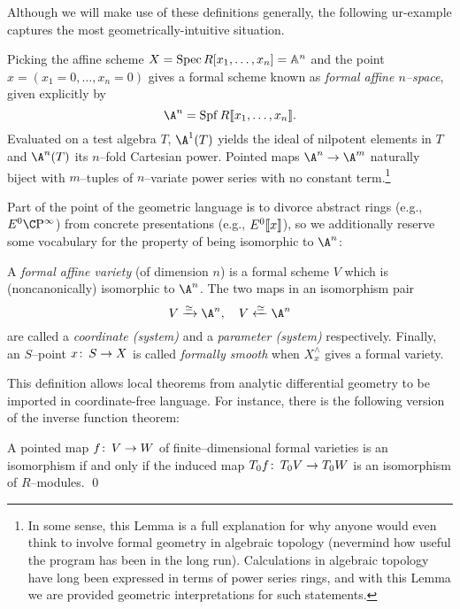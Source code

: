 Although we will make use of these definitions generally, the following ur-example captures the most geometrically-intuitive situation.

\begin{example}\label{MapsOfFVarsArePowerSeries}
Picking the affine scheme $X = \operatorname{Spec} R[x_1, \ldots, x_n] = \mathbb A^n$ and the point $x = (x_1 = 0, \ldots, x_n = 0)$ gives a formal scheme known as \textit{formal affine $n$--space}, given explicitly by \[\A^n = \Spf R\llbracket x_1, \ldots, x_n\rrbracket.\]  Evaluated on a test algebra $T$, $\A^1(T)$ yields the ideal of nilpotent elements in $T$ and $\A^n(T)$ its $n$--fold Cartesian power.  Pointed maps $\A^n \to \A^m$ naturally biject with $m$--tuples of $n$--variate power series with no constant term.\footnote{In some sense, this Lemma is a full explanation for why anyone would even think to involve formal geometry in algebraic topology (nevermind how useful the program has been in the long run).  Calculations in algebraic topology have long been expressed in terms of power series rings, and with this Lemma we are provided geometric interpretations for such statements.}
\end{example}

Part of the point of the geometric language is to divorce abstract rings (e.g., $E^0 \CP^\infty$) from concrete presentations (e.g., $E^0\llbracket{x}\rrbracket$), so we additionally reserve some vocabulary for the property of being isomorphic to $\A^n$:
\begin{definition}\label{DefnFormalVariety}
A \textit{formal affine variety} (of dimension $n$) is a formal scheme $V$ which is (noncanonically) isomorphic to $\A^n$.  The two maps in an isomorphism pair \[V \xrightarrow{\simeq} \A^n, \quad V \xleftarrow{\simeq} \A^n\] are called a \textit{coordinate (system)} and a \textit{parameter (system)} respectively.  Finally, an $S$--point $x\colon\thinspace S \to X$ is called \textit{formally smooth} when $X^\wedge_x$ gives a formal variety.
\end{definition}

This definition allows local theorems from analytic differential geometry to be imported in coordinate-free language.  For instance, there is the following version of the inverse function theorem:
\begin{theorem}\label{InverseFunctionTheoremForFVars}
A pointed map $f\colon\thinspace V \to W$ of finite--dimensional formal varieties is an isomorphism if and only if the induced map $T_0 f\colon\thinspace T_0 V \to T_0 W$ is an isomorphism of $R$--modules. \qed
\end{theorem}

